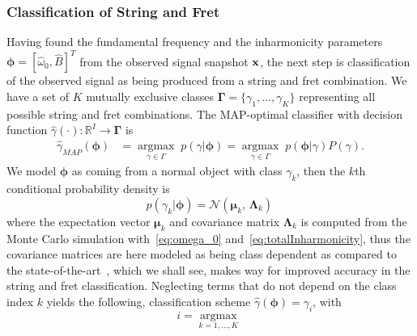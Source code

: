 \documentclass{article}
\begin{document}
\begin{sloppy}
\subsubsection{Classification of String and Fret}
Having found the fundamental frequency and the inharmonicity parameters $\boldsymbol{\phi} = [\widehat{\omega}_0, \widehat{B} ]^T$ from the observed signal snapshot $\mathbf x$, the next step is classification of the observed signal as being produced from a string and fret combination. 
We have a set of $K$ mutually exclusive classes $\boldsymbol{\Gamma}=\{\gamma_1,\dots,\gamma_K\}$ representing all possible string and fret combinations. The MAP-optimal classifier with decision function $\hat{\gamma}(\cdot): \mathbb{R}^I \rightarrow \boldsymbol{\Gamma}  $ is 
\begin{align}
    \hat\gamma_{{MAP}}(\boldsymbol{\phi}) &= \underset{\gamma\in\Gamma}{\operatorname{argmax}}\;{p(\gamma|\boldsymbol{\phi})} = \underset{\gamma\in\Gamma}{\operatorname{argmax}}\;{p(\boldsymbol{\phi}|\gamma)P(\gamma)}.
\end{align}
We model $\boldsymbol{\phi}$ as coming from a normal object with class $\gamma_k$, then the $k$th conditional probability density is   
\begin{equation}
    p(\gamma_k\lvert\boldsymbol{\phi}) =
    \mathcal{N}(\boldsymbol{\mu}_k,\,\boldsymbol{\Lambda}_k)\,
\end{equation}
where the expectation vector $\boldsymbol{\mu}_k$ and covariance matrix $\boldsymbol{ \Lambda }_k$ is computed from the Monte Carlo simulation with~\eqref{eq:omega_0} and~\eqref{eq:totalInharmonicity}, thus the covariance matrices are here modeled as being class dependent as compared to the state-of-the-art~\cite{hjerrild::icassp19}, which we shall see, makes way for improved accuracy in the string and fret classification. %
%
Neglecting terms that do not depend on the class index $k$ yields the following, classification scheme $\hat{\gamma}(\boldsymbol{\phi})={\gamma}_i$, with
%
\begin{equation}\label{eq:classifier}
  i=\underset{k=1,\dots,K}{\operatorname{argmax}}\;

\end{equation}
\end{sloppy}
\end{document}

